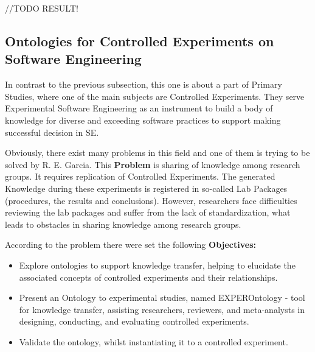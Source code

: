 	//TODO RESULT!
	
	
	
	\subsection{Ontologies for Controlled Experiments on Software Engineering}
	In contrast to the previous subsection, this one is about a part of Primary Studies, where one of the main subjects are Controlled Experiments. They serve Experimental Software Engineering as an instrument to build a body of knowledge for diverse and exceeding software practices to support making successful decision in SE. \newline
	
	Obviously, there exist many problems in this field and one of them is trying to be solved by R. E. Garcia\cite{Gar08}. This \textbf{Problem} is sharing of knowledge among research groups. It requires replication of Controlled Experiments. The generated Knowledge during these experiments is registered in so-called Lab Packages (procedures, the results and conclusions). However, researchers face difficulties reviewing the lab packages and suffer from the lack of standardization, what leads to obstacles in sharing knowledge among research groups. \newline
	
	According to the problem there were set the following \textbf{Objectives:}
		\begin{itemize}
			\item Explore ontologies to support knowledge transfer,
			helping to elucidate the associated concepts of controlled
			experiments and their relationships.
			\item Present an Ontology to experimental studies, named EXPEROntology - tool
			for knowledge transfer, assisting researchers, reviewers,
			and meta-analysts in designing, conducting, and evaluating
			controlled experiments.
			\item Validate the ontology, whilst instantiating it to a controlled experiment.
		\end{itemize}
	  
